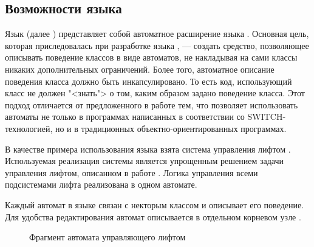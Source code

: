 \subsection{Возможности языка}
Язык  (далее ) представляет собой автоматное расширение языка . Основная цель, которая приследовалась при разработке языка , --- создать средство, позволяющее описывать поведение классов в виде автоматов, не накладывая на сами классы никаких дополнительных ограничений. Более того, автоматное описание поведения класса должно быть инкапсулировано. То есть код, использующий класс не должен "<знать"> о том, каким образом задано поведение класса. Этот подход отличается от предложенного в работе \cite{myUMLSwitchEclipse} тем, что позволяет использовать автоматы не только в программах написанных в соответствии со SWITCH-технологией, но и в традиционных объектно-ориентированных программах.

В качестве примера использования языка  взята система управления лифтом \cite{knuth}. Используемая реализация системы является упрощенным решением задачи управления лифтом, описанном в работе \cite{naumov}. Логика управления всеми подсистемами лифта реализована в одном автомате.

Каждый автомат в языке  связан с некторым классом и описывает его поведение. Для удобства редактирования автомат описывается в отдельном корневом узле \pic{\ref{fig:ElevatorStateMachine}}.

\begin{figure}
 \centering
 \caption{Фрагмент автомата управляющего лифтом}
 \label{fig:ElevatorStateMachine}
\end{figure}


